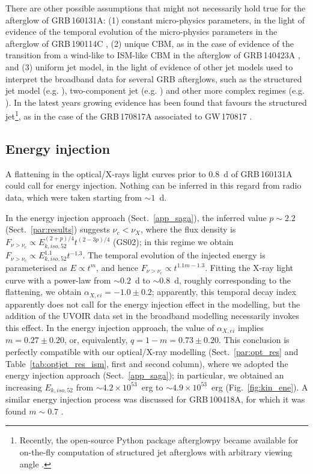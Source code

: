 \documentclass{aa}
\begin{document}
There are other possible assumptions that might not necessarily hold true for the afterglow of GRB\,160131A: (1) constant micro-physics parameters, in the light of evidence of the temporal evolution of the micro-physics parameters in the afterglow of GRB\,190114C \citep{Misra19}, (2) unique CBM, as in the case of evidence of the transition from a wind-like to ISM-like CBM in the afterglow of GRB\,140423A \citep{Li20}, and (3) uniform jet model, in the light of evidence of other jet models used to interpret the broadband data for several GRB afterglows, such as the structured jet model (e.g. \citealp{DeColle12,Granot18,Alexander18,Coughlin20_jet}), two-component jet (e.g. \citealp{Berger03,Peng05,Racusin08,Liu11,Holland12}) and other more complex regimes (e.g. \citealp{Huang04,Wu05,Granot18}).
In the latest years growing evidence has been found that favours the structured jet\footnote{Recently, the open-source Python package {\sc afterglowpy} became available for on-the-fly computation of structured jet afterglows with arbitrary viewing angle \citep{Ryan20}.}, as in the case of the GRB\,170817A associated to GW\,170817 \citep{Alexander18}.


\subsection{Energy injection}
\label{par:ene_inj_grb}

A flattening in the optical/X-rays light curves prior to $0.8$~d of GRB\,160131A could call for energy injection.
Nothing can be inferred in this regard from radio data, which were taken starting from $\sim 1$~d.

In the energy injection approach (Sect.~\ref{app_saga}), the inferred value $p \sim 2.2$ (Sect.~\ref{par:results}) suggests $\nu_c<\nu_X$, where the flux density is $F_{\nu > \nu_c} \propto E_{k,iso,52}^{(2+p)/4} t^{(2-3p)/4}$ (GS02); in this regime we obtain $F_{\nu > \nu_c} \propto E_{k,iso,52}^{1.1} t^{-1.3}$.
The temporal evolution of the injected energy is parameterised as $E \propto t^m$, and hence $F_{\nu > \nu_c} \propto t^{1.1m - 1.3}$.
Fitting the X-ray light curve with a power-law from $\sim 0.2$~d to $\sim 0.8$~d, roughly corresponding to the flattening, we obtain $\alpha_{X,ei} = -1.0 \pm 0.2$; apparently, this temporal decay index apparently does not call for the energy injection effect in the modelling, but the addition of the UVOIR data set in the broadband modelling necessarily invokes this effect.
In the energy injection approach, the value of $\alpha_{X,ei}$ implies $m = 0.27 \pm 0.20$, or, equivalently, $q = 1 - m = 0.73 \pm 0.20$.
This conclusion is perfectly compatible with our optical/X-ray modelling (Sect.~\ref{par:opt_res} and Table~\ref{tab:optjet_res_ism}, first and second column), where we adopted the energy injection approach (Sect.~\ref{app_saga}); in particular, we obtained an increasing $E_{k,iso,52}$ from $\sim 4.2 \times 10^{53}$~erg to $\sim 4.9 \times 10^{53}$~erg (Fig.~\ref{fig:kin_ene}).
A similar energy injection process was discussed for GRB\,100418A, for which it was found $m \sim 0.7$ \citep{Marshall11,Laskar15}.
\end{document}
